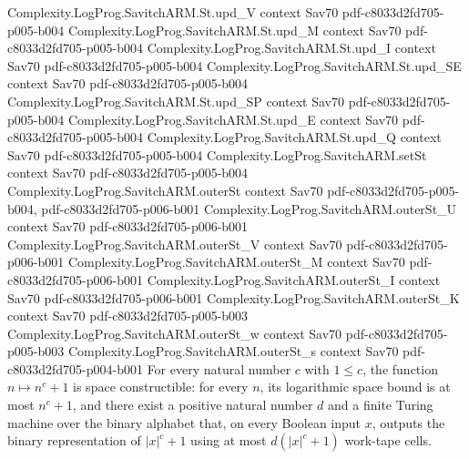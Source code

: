 \begin{theorem}
\proofstep
  {Complexity.LogProg.SavitchARM.St.upd_V}
  {context}
  {Sav70}
  {pdf-c8033d2fd705-p005-b004}
\proofstep
  {Complexity.LogProg.SavitchARM.St.upd_M}
  {context}
  {Sav70}
  {pdf-c8033d2fd705-p005-b004}
\proofstep
  {Complexity.LogProg.SavitchARM.St.upd_I}
  {context}
  {Sav70}
  {pdf-c8033d2fd705-p005-b004}
\proofstep
  {Complexity.LogProg.SavitchARM.St.upd_SE}
  {context}
  {Sav70}
  {pdf-c8033d2fd705-p005-b004}
\proofstep
  {Complexity.LogProg.SavitchARM.St.upd_SP}
  {context}
  {Sav70}
  {pdf-c8033d2fd705-p005-b004}
\proofstep
  {Complexity.LogProg.SavitchARM.St.upd_E}
  {context}
  {Sav70}
  {pdf-c8033d2fd705-p005-b004}
\proofstep
  {Complexity.LogProg.SavitchARM.St.upd_Q}
  {context}
  {Sav70}
  {pdf-c8033d2fd705-p005-b004}
\proofstep
  {Complexity.LogProg.SavitchARM.setSt}
  {context}
  {Sav70}
  {pdf-c8033d2fd705-p005-b004}
\proofstep
  {Complexity.LogProg.SavitchARM.outerSt}
  {context}
  {Sav70}
  {pdf-c8033d2fd705-p005-b004,
    pdf-c8033d2fd705-p006-b001}
\proofstep
  {Complexity.LogProg.SavitchARM.outerSt_U}
  {context}
  {Sav70}
  {pdf-c8033d2fd705-p006-b001}
\proofstep
  {Complexity.LogProg.SavitchARM.outerSt_V}
  {context}
  {Sav70}
  {pdf-c8033d2fd705-p006-b001}
\proofstep
  {Complexity.LogProg.SavitchARM.outerSt_M}
  {context}
  {Sav70}
  {pdf-c8033d2fd705-p006-b001}
\proofstep
  {Complexity.LogProg.SavitchARM.outerSt_I}
  {context}
  {Sav70}
  {pdf-c8033d2fd705-p006-b001}
\proofstep
  {Complexity.LogProg.SavitchARM.outerSt_K}
  {context}
  {Sav70}
  {pdf-c8033d2fd705-p005-b003}
\proofstep
  {Complexity.LogProg.SavitchARM.outerSt_w}
  {context}
  {Sav70}
  {pdf-c8033d2fd705-p005-b003}
\proofstep
  {Complexity.LogProg.SavitchARM.outerSt_s}
  {context}
  {Sav70}
  {pdf-c8033d2fd705-p004-b001}
For every natural number $c$ with $1\leq c$, the function $n\mapsto n^c+1$ is space
constructible: for every $n$, its logarithmic space bound is at most $n^c+1$, and there
exist a positive natural number $d$ and a finite Turing machine over the binary alphabet
that, on every Boolean input $x$, outputs the binary representation of $|x|^c+1$ using
at most $d(|x|^c+1)$ work-tape cells.
\end{theorem}

